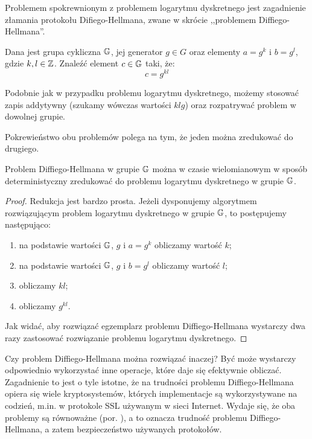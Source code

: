 \noindent
Problemem spokrewnionym z problemem logarytmu dyskretnego
jest zagadnienie złamania protokołu Difiego-Hellmana,
zwane w skrócie ,,problemem Diffiego-Hellmana''.

\begin{problem}
Dana jest grupa cykliczna $\mathbb{G}$,
jej generator $g \in G$
oraz elementy $a = g^k$ i $b = g^l$,
gdzie $k, l \in \mathbb{Z}$.
Znaleźć element $c \in \mathbb{G}$ taki, że:
\begin{equation}
c = g^{kl}
\end{equation}
\end{problem}

\begin{remark}
Podobnie jak w przypadku problemu logarytmu dyskretnego,
możemy stosować zapis addytywny (szukamy wówczas wartości $klg$)
oraz rozpatrywać problem w dowolnej grupie.
\end{remark}

\noindent
Pokrewieństwo obu problemów polega na tym,
że jeden można zredukować do drugiego.

\begin{theorem}
Problem Diffiego-Hellmana w grupie $\mathbb{G}$ można
w czasie wielomianowym w sposób deterministyczny
zredukować do problemu logarytmu dyskretnego w grupie $\mathbb{G}$.
\end{theorem}

\begin{proof}
Redukcja jest bardzo prosta.
Jeżeli dysponujemy algorytmem rozwiązującym
problem logarytmu dyskretnego w grupie $\mathbb{G}$,
to postępujemy następująco:
\begin{enumerate}
\item na podstawie wartości $\mathbb{G}$, $g$ i $a = g^k$ obliczamy wartość $k$;
\item na podstawie wartości $\mathbb{G}$, $g$ i $b = g^l$ obliczamy wartość $l$;
\item obliczamy $kl$;
\item obliczamy $g^{kl}$.
\end{enumerate}
Jak widać, aby rozwiązać egzemplarz problemu Diffiego-Hellmana
wystarczy dwa razy zastosować rozwiązanie problemu logarytmu dyskretnego.
\end{proof}

\noindent
Czy problem Diffiego-Hellmana można rozwiązać inaczej?
Być może wystarczy odpowiednio wykorzystać inne operacje,
które daje się efektywnie obliczać.
Zagadnienie to jest o tyle istotne,
że na trudności problemu Diffiego-Hellmana
opiera się wiele kryptosystemów,
których implementacje są wykorzystywane na codzień,
m.in. w protokole SSL używanym w sieci Internet.
Wydaje się, że oba problemy są równoważne (por. \cite{maurer}),
a to oznacza trudność problemu Diffiego-Hellmana,
a zatem bezpieczeństwo używanych protokołów.

